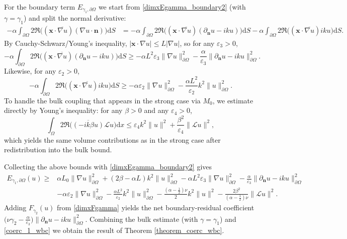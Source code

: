 \documentclass[twoside,11pt]{article}
\def\dimx{\nu }
\def\d{{\mathrm d}}
\def\L{{\mathscr{L}}}
\renewcommand{\vec}[1]{\boldsymbol{#1}}
\def\L{{\mathscr{L}}}
\begin{document}
{ For the boundary term
$E_{\gamma_1,\partial\Omega}$ we start from
\eqref{dimxEgamma_boundary2} (with $\gamma=\gamma_1$) and split the
normal derivative:
\begin{align*}
-\alpha\int_{\partial\Omega}2 \Re \big((\vec x \cdot \overline{\nabla u})(\nabla u \cdot \vec n)\big) \d S
&= -\alpha\int_{\partial\Omega}2 \Re \big((\vec x \cdot \overline{\nabla u}) (\partial_{\mathbf n}u-ik u)\big) \d S 
-\alpha\int_{\partial\Omega}2 \Re \big((\vec x \cdot \overline{\nabla u}) ik u\big) \d S.
\end{align*}
By Cauchy-Schwarz/Young's inequality, $| \vec x \cdot \nabla u |\le L|\nabla u|$, so for any $\varepsilon_3>0$,
\[
-\alpha\int_{\partial\Omega}2 \Re \big((\vec x \cdot \overline{\nabla u}) (\partial_{\mathbf n}u-ik u)\big) \d S
 \ge 
-\alpha L^2\varepsilon_3 \|\nabla u\|^2_{\partial\Omega} - \frac{\alpha}{\varepsilon_3} \|\partial_{\mathbf n}u-ik u\|^2_{\partial\Omega}.
\]
Likewise, for any $\varepsilon_2>0$,
\[
-\alpha\int_{\partial\Omega}2 \Re \big((\vec x \cdot \overline{\nabla u}) ik u\big) \d S
 \ge 
-\alpha\varepsilon_2 \|\nabla u\|^2_{\partial\Omega} - \frac{\alpha L^2}{\varepsilon_2} k^2\|u\|^2_{\partial\Omega}.
\]
{To handle the bulk coupling that appears in the strong case via $M_0$, we estimate directly by Young’s inequality: for any $\beta>0$ and any $\varepsilon_4>0$,}
\[
\int_\Omega 2 \Re \big(\overline{(-ik\beta u)} \L u\big) \d x
 \le  \varepsilon_4 k^2\|u\|^2  +  \frac{\beta^2}{\varepsilon_4} \|\L u\|^2,
\]
{which yields the same volume contributions as in the strong case after redistribution into the bulk bound.}

Collecting the above bounds with \eqref{dimxEgamma_boundary2} gives
\begin{equation}\label{coerc_1_wbc}
\begin{split}
E_{\gamma_1,\partial\Omega}(u)
 \ge & \alpha L_0 \|\nabla u\|^2_{\partial\Omega}
 +  (2\beta-\alpha L) k^2\|u\|^2_{\partial\Omega}
 - \alpha L^2\varepsilon_3 \|\nabla u\|^2_{\partial\Omega}
 - \frac{\alpha}{\varepsilon_3} \|\partial_{\mathbf n}u-ik u\|^2_{\partial\Omega}\\
&- \alpha\varepsilon_2 \|\nabla u\|^2_{\partial\Omega}
 - \frac{\alpha L^2}{\varepsilon_2} k^2\|u\|^2_{\partial\Omega}
 - \frac{(\alpha-\tfrac12) \dimx}{2} k^2\|u\|^2
 - \frac{2\beta^2}{(\alpha-\tfrac12) \dimx} \|\L u\|^2.
\end{split}
\end{equation}
Adding $F_{\gamma_2}(u)$ from \eqref{dimxFgamma} yields the net
boundary-residual coefficient ${\big(\dimx \gamma_2 -
  \tfrac{\alpha}{\varepsilon_3}\big) \|\partial_{\mathbf n}u-ik
  u\|^2_{\partial\Omega}.}$ Combining the bulk estimate (with $\gamma
= \gamma_1$) and \eqref{coerc_1_wbc} we obtain the result of Theorem
\ref{theorem_coerc_wbc}.

}
\end{document}
